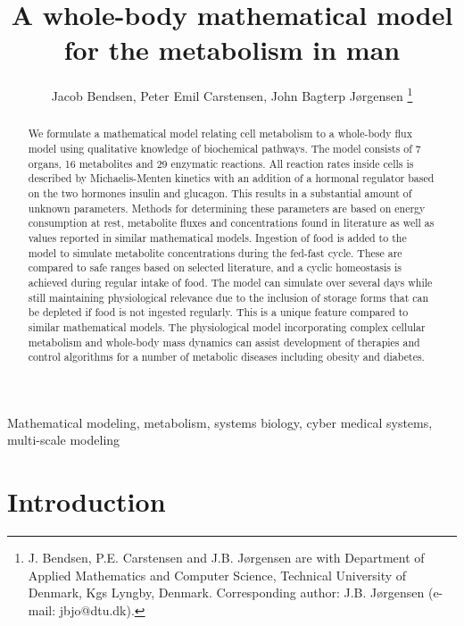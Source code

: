 \documentclass{IEEEtran}
\begin{document}
\title{A whole-body mathematical model for the metabolism in man}

\author{Jacob Bendsen, Peter Emil Carstensen, John Bagterp Jørgensen
\thanks{J. Bendsen, P.E. Carstensen and J.B. J{\o}rgensen are with Department of Applied Mathematics and Computer Science, Technical University of Denmark, Kgs Lyngby, Denmark. Corresponding author: J.B. J{\o}rgensen (e-mail: jbjo@dtu.dk).}
}

\maketitle

\begin{abstract}
We formulate a mathematical model relating cell metabolism to a whole-body flux model using qualitative knowledge of biochemical pathways. The model consists of 7 organs, 16 metabolites and 29 enzymatic reactions. All reaction rates inside cells is described by Michaelis-Menten kinetics with an addition of a hormonal regulator based on the two hormones insulin and glucagon. This results in a substantial amount of unknown parameters. Methods for determining these parameters are based on energy consumption at rest, metabolite fluxes and concentrations found in literature as well as values reported in similar mathematical models. Ingestion of food is added to the model to simulate metabolite concentrations during the fed-fast cycle. These are compared to safe ranges based on selected literature, and a cyclic homeostasis is achieved during regular intake of food. The model can simulate over several days while still maintaining physiological relevance due to the inclusion of storage forms that can be depleted if food is not ingested regularly. This is a unique feature compared to similar mathematical models. The physiological model incorporating complex cellular metabolism and whole-body mass dynamics can assist development of therapies and control algorithms for a number of metabolic diseases including obesity and diabetes.
\end{abstract}

\begin{IEEEkeywords}
Mathematical modeling, metabolism, systems biology, cyber medical systems, multi-scale modeling
\end{IEEEkeywords}

\section{Introduction}
\label{sec:introduction}
\end{document}
